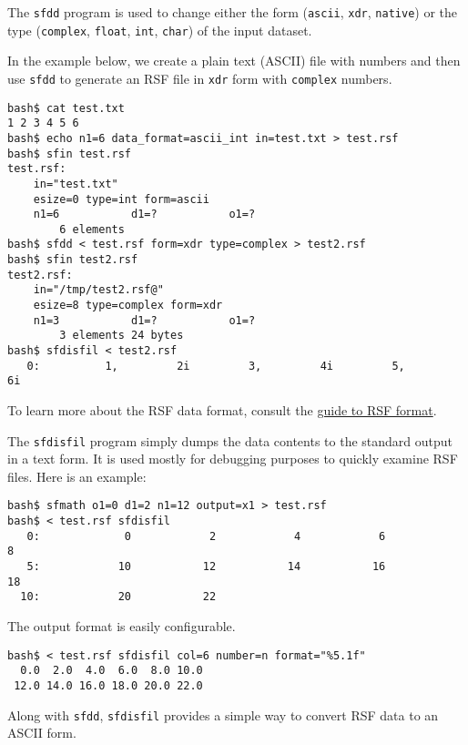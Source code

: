 \noindent\doublebox{\parbox{\textwidth}{

}}

The \texttt{sfdd} program is used to change either the form (\texttt{ascii},
\texttt{xdr}, \texttt{native}) or the type (\texttt{complex}, \texttt{float},
\texttt{int}, \texttt{char}) of the input dataset. 

In the example below, we create a plain text (ASCII) file with numbers and
then use \texttt{sfdd} to generate an RSF file in \texttt{xdr} form with
\texttt{complex} numbers. 
\begin{verbatim}
bash$ cat test.txt
1 2 3 4 5 6
bash$ echo n1=6 data_format=ascii_int in=test.txt > test.rsf
bash$ sfin test.rsf
test.rsf:
    in="test.txt"
    esize=0 type=int form=ascii
    n1=6           d1=?           o1=?
        6 elements
bash$ sfdd < test.rsf form=xdr type=complex > test2.rsf
bash$ sfin test2.rsf
test2.rsf:
    in="/tmp/test2.rsf@"
    esize=8 type=complex form=xdr
    n1=3           d1=?           o1=?
        3 elements 24 bytes
bash$ sfdisfil < test2.rsf
   0:          1,         2i         3,         4i         5,         6i
\end{verbatim}

To learn more about the RSF data format, consult the
\href{http://www.reproducibility.org/RSF/book/rsf/rsf/format_html/}{guide to RSF format}.

\noindent\doublebox{\parbox{\textwidth}{

}}

The \texttt{sfdisfil} program simply dumps the data contents to the standard
output in a text form. It is used mostly for debugging purposes to quickly
examine RSF files. Here is an example:
\begin{verbatim}
bash$ sfmath o1=0 d1=2 n1=12 output=x1 > test.rsf
bash$ < test.rsf sfdisfil
   0:             0            2            4            6            8
   5:            10           12           14           16           18
  10:            20           22
\end{verbatim}
The output format is easily configurable.
\begin{verbatim}
bash$ < test.rsf sfdisfil col=6 number=n format="%5.1f"
  0.0  2.0  4.0  6.0  8.0 10.0
 12.0 14.0 16.0 18.0 20.0 22.0
\end{verbatim}
Along with \texttt{sfdd}, \texttt{sfdisfil} provides a simple way to convert
RSF data to an ASCII form.

\noindent\doublebox{\parbox{\textwidth}{
    
}}

